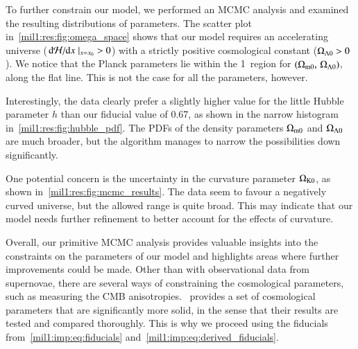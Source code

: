     To further constrain our model, we performed an MCMC analysis and examined the resulting distributions of parameters. The scatter plot in~\cref{mil1:res:fig:omega_space} shows that our model requires an accelerating universe ($\dv*{\mathcal{H}}{x}|_{x=x_0} > 0$) with a strictly positive cosmological constant ($\Omega_{\mathrm{\Lambda}0}>0$). We notice that the Planck parameters lie within the 1\textsigma~region for $(\Omega_{\mathrm{m}0},\, \Omega_{\mathrm{\Lambda}0})$, along the flat line. This is not the case for all the parameters, however. 
    
    Interestingly, the data clearly prefer a slightly higher value for the little Hubble parameter $h$ than our fiducial value of 0.67, as shown in the narrow histogram in~\cref{mil1:res:fig:hubble_pdf}. The PDFs of the density parameters $\Omega_{\mathrm{m}0}$ and $\Omega_{\mathrm{\Lambda}0}$ are much broader, but the algorithm manages to narrow the possibilities down significantly.

    One potential concern is the uncertainty in the curvature parameter $\Omega_{\mathrm{K}0}$, as shown in~\cref{mil1:res:fig:mcmc_results}. The data seem to favour a negatively curved universe, but the allowed range is quite broad. This may indicate that our model needs further refinement to better account for the effects of curvature. 
    
    Overall, our primitive MCMC analysis provides valuable insights into the constraints on the parameters of our model and highlights areas where further improvements could be made. Other than with observational data from supernovae, there are several ways of constraining the cosmological parameters, such as measuring the CMB anisotropies.~\citet{Planckdata} provides a set of cosmological parameters that are significantly more solid, in the sense that their results are tested and compared thoroughly. This is why we proceed using the fiducials from~\cref{mil1:imp:eq:fiducials} and~\cref{mil1:imp:eq:derived_fiducials}.





